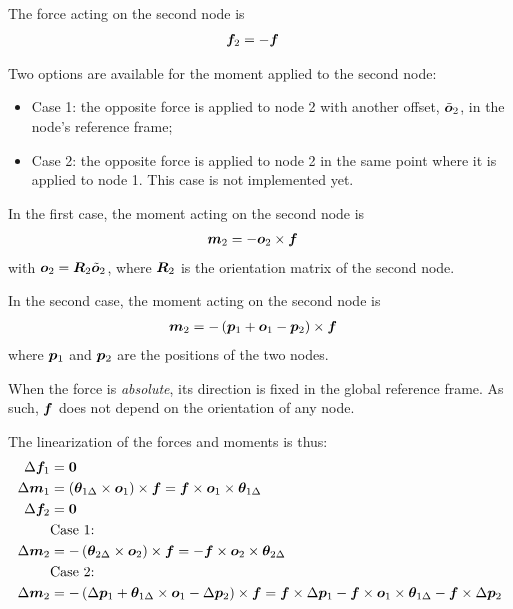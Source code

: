 The force acting on the second node is
\begin{align}
	\bm{f}_2 &= - \bm{f}
\end{align}

Two options are available for the moment applied to the second node:
\begin{itemize}
\item Case 1: the opposite force is applied to node 2 with another offset, $\tilde{\bm{o}}_2$, in the node's reference frame;
\item Case 2: the opposite force is applied to node 2 in the same point where it is applied to node 1.  This case is not implemented yet.
\end{itemize}

In the first case, the moment acting on the second node is
\begin{align}
	\bm{m}_2 &= - \bm{o}_2 \times \bm{f}
\end{align}
with $\bm{o}_2 = \bm{R}_2 \tilde{\bm{o}}_2$, where $\bm{R}_2$ is the orientation matrix of the second node.

In the second case, the moment acting on the second node is
\begin{align}
	\bm{m}_2 &= - \left( \bm{p}_1 + \bm{o}_1 - \bm{p}_2 \right) \times \bm{f}
\end{align}
where $\bm{p}_1$ and $\bm{p}_2$ are the positions of the two nodes.

When the force is \emph{absolute}, its direction is fixed in the global reference frame.  As such, $\bm{f}$ does not depend on the orientation of any node.

The linearization of the forces and moments is thus:
\begin{subequations}
\begin{align}
	\Delta\bm{f}_1
	&=
	\bm{0}
	\\
	\Delta\bm{m}_1
	&=
	\left( \bm{\theta}_{1\Delta} \times \bm{o}_1 \right) \times \bm{f}
	=
	\bm{f} \times \bm{o}_1 \times \bm{\theta}_{1\Delta}
	\\
	\Delta\bm{f}_2
	&=
	\bm{0}
	\\
	&\text{Case 1:} \nonumber \\
	\Delta\bm{m}_2
	&=
	- \left( \bm{\theta}_{2\Delta} \times \bm{o}_2 \right) \times \bm{f}
	=
	- \bm{f} \times \bm{o}_2 \times \bm{\theta}_{2\Delta}
	\\
	&\text{Case 2:} \nonumber \\
	\Delta\bm{m}_2
	&=
	- \left( \Delta\bm{p}_1 + \bm{\theta}_{1\Delta} \times \bm{o}_1 - \Delta\bm{p}_2 \right) \times \bm{f}
	=
	\bm{f} \times \Delta\bm{p}_1 - \bm{f} \times \bm{o}_1 \times \bm{\theta}_{1\Delta} - \bm{f} \times \Delta\bm{p}_2
\end{align}
\end{subequations}


